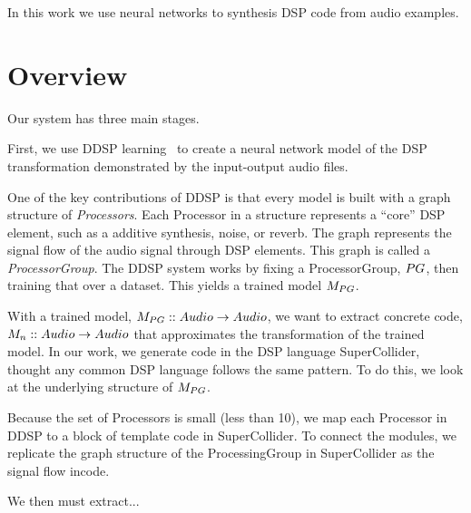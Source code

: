 \documentclass[12pt]{article}
\begin{document}
\maketitle

In this work we use neural networks to synthesis DSP code from audio examples.

\section{Overview}

Our system has three main stages.

First, we use DDSP learning~\cite{} to create a neural network model of the DSP transformation demonstrated by the input-output audio files.

One of the key contributions of DDSP is that every model is built with a graph structure of \textit{Processors}.
Each Processor in a structure represents a ``core'' DSP element, such as a additive synthesis, noise, or reverb.
The graph represents the signal flow of the audio signal through DSP elements.
This graph is called a \textit{ProcessorGroup}.
The DDSP system works by fixing a ProcessorGroup, $PG$, then training that over a dataset.
This yields a trained model $M_{PG}$.

With a trained model, $M_{PG} :: Audio \to Audio$, we want to extract concrete code, $M_n :: Audio \to Audio$ that approximates the transformation of the trained model.
In our work, we generate code in the DSP language SuperCollider, thought any common DSP language follows the same pattern.
To do this, we look at the underlying structure of $M_{PG}$.

Because the set of Processors is small (less than 10), we map each Processor in DDSP to a block of template code in SuperCollider.
To connect the modules, we replicate the graph structure of the ProcessingGroup in SuperCollider as the signal flow incode.

We then must extract...








\end{document}
